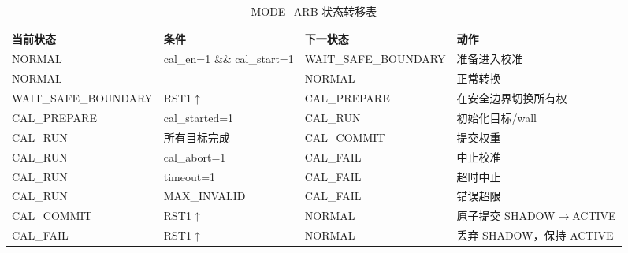 \documentclass[UTF8,a4paper,11pt]{ctexart}
\begin{document}
\begin{table}[H]
\centering
\caption{MODE\_ARB 状态转移表}
\label{tab:modearb-transition}
\small
\begin{tabular}{llll}
\toprule
当前状态 & 条件 & 下一状态 & 动作 \\
\midrule
NORMAL              & cal\_en=1 \&\& cal\_start=1 & WAIT\_SAFE\_BOUNDARY & 准备进入校准 \\
NORMAL              & ---                         & NORMAL               & 正常转换 \\
WAIT\_SAFE\_BOUNDARY & RST1$\uparrow$              & CAL\_PREPARE         & 在安全边界切换所有权 \\
CAL\_PREPARE        & cal\_started=1              & CAL\_RUN             & 初始化目标/wall \\
CAL\_RUN            & 所有目标完成                 & CAL\_COMMIT          & 提交权重 \\
CAL\_RUN            & cal\_abort=1                & CAL\_FAIL            & 中止校准 \\
CAL\_RUN            & timeout=1                   & CAL\_FAIL            & 超时中止 \\
CAL\_RUN            & MAX\_INVALID                & CAL\_FAIL            & 错误超限 \\
CAL\_COMMIT         & RST1$\uparrow$              & NORMAL               & 原子提交 SHADOW$\rightarrow$ACTIVE \\
CAL\_FAIL           & RST1$\uparrow$              & NORMAL               & 丢弃 SHADOW，保持 ACTIVE \\
\bottomrule
\end{tabular}
\end{table}
\end{document}
